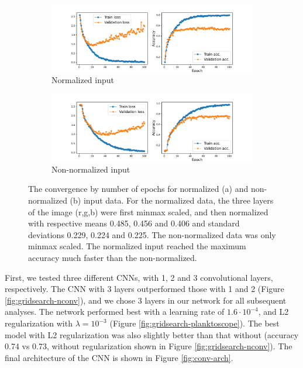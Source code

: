 \begin{figure}
    \centering
    \begin{subfigure}{1\linewidth}
        \includegraphics[width=\linewidth]{examples/tests_even/figs/CNN-test-epochs100-64.pdf}
        \caption{Normalized input}
        \label{fig:epochs1}
    \end{subfigure}
    \begin{subfigure}{1\linewidth}
        \includegraphics[width=\linewidth]{examples/tests_even/figs/CNN-test-epochs100-64notnorm.pdf}
        \caption{Non-normalized input}
        \label{fig:epochs2}
    \end{subfigure}
    \caption{The convergence by number of epochs for normalized (a) and non-normalized (b) input data. For the normalized data, the three layers of the image (r,g,b) were first minmax scaled, and then normalized with respective means 0.485, 0.456 and 0.406 and standard deviations 0.229, 0.224 and 0.225. The non-normalized data was only minmax scaled. The normalized input reached the maximum accuracy much faster than the non-normalized.}
    \label{fig:epochs}
\end{figure}


First, we tested three different CNNs, with 1, 2 and 3 convolutional layers, respectively. The CNN with 3 layers outperformed those with 1 and 2 (Figure \ref{fig:gridsearch-nconv}), and we chose 3 layers in our network for all subsequent analyses. The network performed best with a learning rate of $1.6 \cdot 10^{-4}$, and L2 regularization with $\lambda = 10^{-3}$ (Figure \ref{fig:gridsearch-planktoscope}). The best model with L2 regularization was also slightly better than that without (accuracy 0.74 vs 0.73, without regularization shown in Figure \ref{fig:gridsearch-nconv}). The final architecture of the CNN is shown in Figure \ref{fig:conv-arch}.






